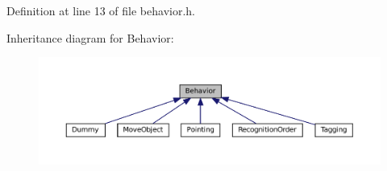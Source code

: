 Definition at line 13 of file behavior.\+h.



Inheritance diagram for Behavior\+:
\nopagebreak
\begin{figure}[H]
\begin{center}
\leavevmode
\includegraphics[width=350pt]{classBehavior__inherit__graph}
\end{center}
\end{figure}

